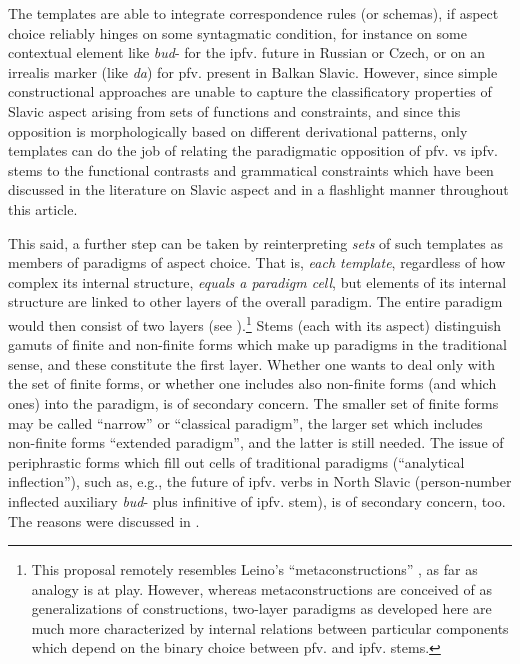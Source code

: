 \documentclass[output=paper]{langscibook}
\begin{document}
The templates are able to integrate correspondence rules (or schemas), if aspect choice reliably hinges on some syntagmatic condition, for instance on some contextual element like \textit{bud}{}- for the ipfv. future in Russian or Czech, or on an irrealis marker (like \textit{da}) for pfv. present in Balkan Slavic. However, since simple constructional approaches are unable to capture the classificatory properties of Slavic aspect arising from sets of functions and constraints, and since this opposition is morphologically based on different derivational patterns, only templates can do the job of relating the paradigmatic opposition of pfv. vs ipfv. stems to the functional contrasts and grammatical constraints which have been discussed in the literature on Slavic aspect and in a flashlight manner throughout this article.

This said, a further step can be taken by reinterpreting \emph{sets} of such templates as members of paradigms of aspect choice. That is, \emph{each template}, regardless of how complex its internal structure, \emph{equals a paradigm cell}, but elements of its internal structure are linked to other layers of the overall paradigm. The entire paradigm would then consist of two layers (see ).\footnote{This proposal remotely resembles Leino's “metaconstructions” , as far as analogy is at play. However, whereas metaconstructions are conceived of as generalizations of constructions, two-layer paradigms as developed here are much more characterized by internal relations between particular components which depend on the binary choice between pfv. and ipfv. stems.} Stems (each with its aspect) distinguish gamuts of finite and non-finite forms which make up paradigms in the traditional sense, and these constitute the first layer. Whether one wants to deal only with the set of finite forms, or whether one includes also non-finite forms (and which ones) into the paradigm, is of secondary concern. The smaller set of finite forms may be called ``narrow'' or ``classical paradigm'', the larger set which includes non-finite forms ``extended paradigm'', and the latter is still needed. The issue of periphrastic forms which fill out cells of traditional paradigms (“analytical inflection”), such as, e.g., the future of ipfv. verbs in North Slavic (person-number inflected auxiliary \textit{bud}{}- plus infinitive of ipfv. stem), is of secondary concern, too. The reasons were discussed in .
\end{document}
